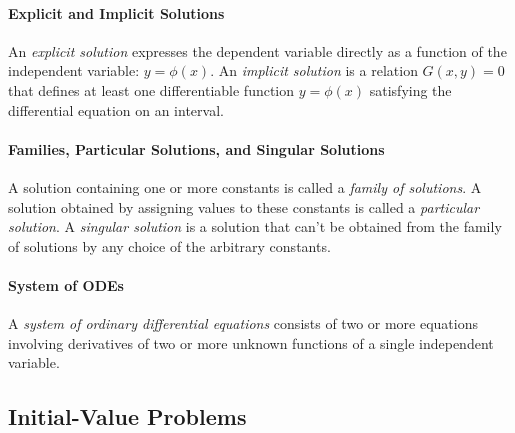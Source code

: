 \documentclass[oneside]{book}
\begin{document}
\paragraph{Explicit and Implicit Solutions}{
    An \emph{explicit solution} expresses the dependent variable directly as a
    function of the independent variable: $y=\phi(x)$. An \emph{implicit solution} is a relation $ G(x,y)=0$ that defines at least one differentiable function $y=\phi(x)$ satisfying the differential equation on an interval.
}


\paragraph{Families, Particular Solutions, and Singular Solutions}{
    A solution containing one or more constants is called a
    \emph{family of solutions}. A solution obtained by assigning values
    to these constants is called a \emph{particular solution}. A \emph{singular solution} is a solution that can't be obtained from the family of solutions by any choice of the arbitrary constants.
}


\paragraph{System of ODEs}{
    A \emph{system of ordinary differential equations} consists of two or more
    equations involving derivatives of two or more unknown functions of a single
    independent variable. 
}

\subsection{Initial-Value Problems}

\end{document}
